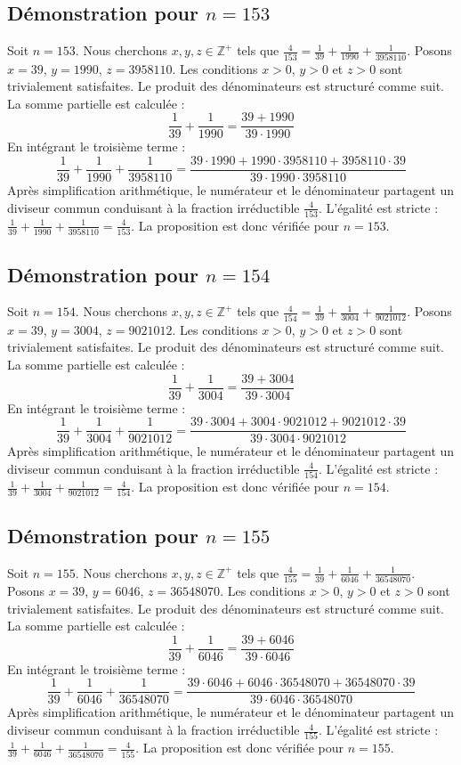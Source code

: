 \documentclass[11pt,a4paper]{article}
\begin{document}
\subsection{Démonstration pour $n = 153$}
Soit $n = 153$. Nous cherchons $x, y, z \in \mathbb{Z}^{+}$ tels que $\frac{4}{153} = \frac{1}{39} + \frac{1}{1990} + \frac{1}{3958110}$.
Posons $x = 39$, $y = 1990$, $z = 3958110$.
Les conditions $x > 0$, $y > 0$ et $z > 0$ sont trivialement satisfaites.
Le produit des dénominateurs est structuré comme suit. La somme partielle est calculée :
$$ \frac{1}{39} + \frac{1}{1990} = \frac{39+1990}{39 \cdot 1990} $$
En intégrant le troisième terme :
$$ \frac{1}{39} + \frac{1}{1990} + \frac{1}{3958110} = \frac{39 \cdot 1990 + 1990 \cdot 3958110 + 3958110 \cdot 39}{39 \cdot 1990 \cdot 3958110} $$
Après simplification arithmétique, le numérateur et le dénominateur partagent un diviseur commun conduisant à la fraction irréductible $\frac{4}{153}$.
L'égalité est stricte : $\frac{1}{39} + \frac{1}{1990} + \frac{1}{3958110} = \frac{4}{153}$.
La proposition est donc vérifiée pour $n = 153$.
\subsection{Démonstration pour $n = 154$}
Soit $n = 154$. Nous cherchons $x, y, z \in \mathbb{Z}^{+}$ tels que $\frac{4}{154} = \frac{1}{39} + \frac{1}{3004} + \frac{1}{9021012}$.
Posons $x = 39$, $y = 3004$, $z = 9021012$.
Les conditions $x > 0$, $y > 0$ et $z > 0$ sont trivialement satisfaites.
Le produit des dénominateurs est structuré comme suit. La somme partielle est calculée :
$$ \frac{1}{39} + \frac{1}{3004} = \frac{39+3004}{39 \cdot 3004} $$
En intégrant le troisième terme :
$$ \frac{1}{39} + \frac{1}{3004} + \frac{1}{9021012} = \frac{39 \cdot 3004 + 3004 \cdot 9021012 + 9021012 \cdot 39}{39 \cdot 3004 \cdot 9021012} $$
Après simplification arithmétique, le numérateur et le dénominateur partagent un diviseur commun conduisant à la fraction irréductible $\frac{4}{154}$.
L'égalité est stricte : $\frac{1}{39} + \frac{1}{3004} + \frac{1}{9021012} = \frac{4}{154}$.
La proposition est donc vérifiée pour $n = 154$.
\subsection{Démonstration pour $n = 155$}
Soit $n = 155$. Nous cherchons $x, y, z \in \mathbb{Z}^{+}$ tels que $\frac{4}{155} = \frac{1}{39} + \frac{1}{6046} + \frac{1}{36548070}$.
Posons $x = 39$, $y = 6046$, $z = 36548070$.
Les conditions $x > 0$, $y > 0$ et $z > 0$ sont trivialement satisfaites.
Le produit des dénominateurs est structuré comme suit. La somme partielle est calculée :
$$ \frac{1}{39} + \frac{1}{6046} = \frac{39+6046}{39 \cdot 6046} $$
En intégrant le troisième terme :
$$ \frac{1}{39} + \frac{1}{6046} + \frac{1}{36548070} = \frac{39 \cdot 6046 + 6046 \cdot 36548070 + 36548070 \cdot 39}{39 \cdot 6046 \cdot 36548070} $$
Après simplification arithmétique, le numérateur et le dénominateur partagent un diviseur commun conduisant à la fraction irréductible $\frac{4}{155}$.
L'égalité est stricte : $\frac{1}{39} + \frac{1}{6046} + \frac{1}{36548070} = \frac{4}{155}$.
La proposition est donc vérifiée pour $n = 155$.
\end{document}

